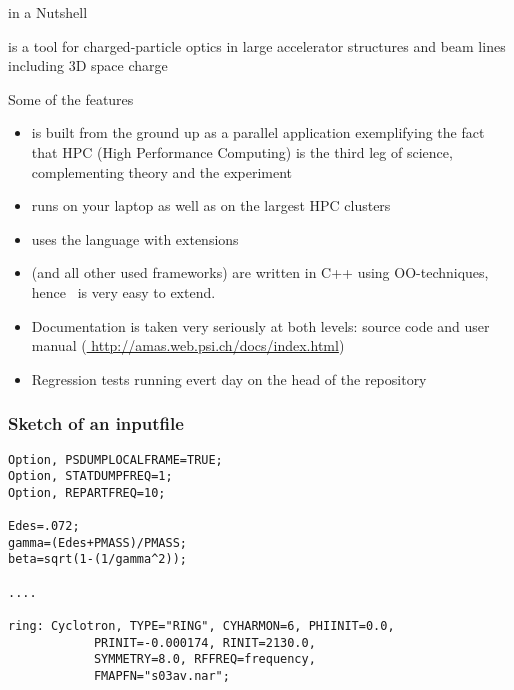 \documentclass[xcolor=pdftex,table,10pt,yellow,mathserif]{beamer}
\begin{document}
\begin{frame}{\opal in a Nutshell} {}
\begin{alertblock}{}  
 \opal is a tool for charged-particle optics in large
accelerator structures and beam lines including 3D space charge
\end{alertblock}
\begin{block}{Some of the features}  
\begin{itemize}
\item \opal is built from the ground up as a parallel application exemplifying the fact that HPC (High Performance Computing) 
is the third leg of science, complementing theory and the experiment
\item  \opal runs on your laptop as well as on the largest HPC clusters
\item \opal uses the \mad language with extensions
\item \opal (and all other used frameworks) are written in C++ using OO-techniques, hence \opal\ is very easy to extend.
\item Documentation is taken very seriously at both levels: source code and user manual (\url{ http://amas.web.psi.ch/docs/index.html})
\item Regression tests running evert day on the head of the repository
\end{itemize}
\end{block}
\end{frame}


\begin{frame}[fragile]
\frametitle{Sketch of an inputfile} 
\begin{verbatim}
Option, PSDUMPLOCALFRAME=TRUE;
Option, STATDUMPFREQ=1;
Option, REPARTFREQ=10;

Edes=.072;
gamma=(Edes+PMASS)/PMASS;
beta=sqrt(1-(1/gamma^2));

....

ring: Cyclotron, TYPE="RING", CYHARMON=6, PHIINIT=0.0,
			PRINIT=-0.000174, RINIT=2130.0,
			SYMMETRY=8.0, RFFREQ=frequency,
			FMAPFN="s03av.nar";

\end{verbatim}
\end{frame}
\end{document}
